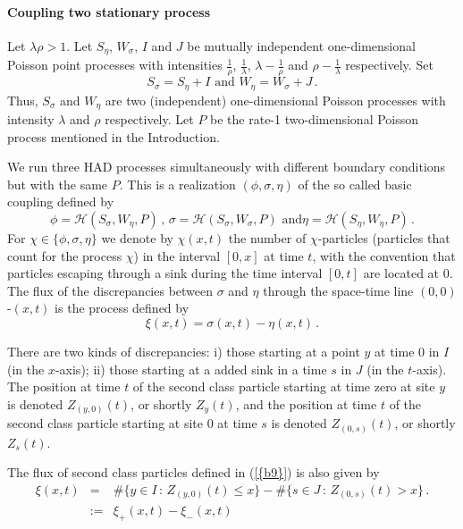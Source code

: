 \documentclass[reqno, 12pt]{amsart}
\begin{document}
\paragraph{\bf Coupling two stationary process} Let $\lambda\rho>1$. Let
$S_\eta$, $W_\sigma$, $I$ and $J$ be mutually independent one-dimensional
Poisson point processes with intensities $\frac{1}{\rho}$, $\frac{1}{\lambda}$,
$\lambda-\frac1\rho$ and $\rho-\frac1\lambda$ respectively. Set
\begin{equation}\label{flux-0}
S_\sigma=S_\eta + I\mbox{ and }W_\eta=W_\sigma + J\,.
\end{equation}
Thus, $S_\sigma$ and $W_\eta$ are two (independent) one-dimensional Poisson
processes with intensity $\lambda$ and $\rho$ respectively. Let $P$ be the
rate-1 two-dimensional Poisson process mentioned in the Introduction.

We run three HAD processes simultaneously with different boundary
conditions but with the same $P$. This is a realization $(\phi,\sigma,\eta)$ of
the so called basic coupling defined by
\[
\phi={{\mathcal H}}(S_\sigma,W_\eta,P)\,,\,\sigma={{\mathcal H}}(S_\sigma,W_\sigma,P)\mbox{ and
}\eta={{\mathcal H}}(S_\eta,W_\eta,P)\,.
\]
For $\chi\in\{\phi,\sigma,\eta\}$ we denote by $\chi(x,t)$ the number of
$\chi$-particles (particles that count for the process $\chi$) in the interval
$[0,x]$ at time $t$, with the convention that particles escaping through a sink
during the time interval $[0,t]$ are located at $0$. The flux of the
discrepancies between $\sigma$ and $\eta$ through the space-time line
$(0,0)$-$(x,t)$ is the process defined by
\begin{equation}
  \label{b9}
  \xi(x,t)=\sigma(x,t)-\eta(x,t)\,.
\end{equation}

There are two kinds of discrepancies: i) those starting at a point $y$ at time
$0$ in $I$ (in the $x$-axis); ii) those starting at a added sink in a time $s$ in $J$ (in
the $t$-axis). The position at time $t$ of the second class particle starting at time zero
at site $y$ is denoted $Z_{(y,0)}(t)$, or shortly $Z_{y}(t)$, and the position
at time $t$ of the second class particle starting at site $0$ at time
$s$ is denoted $Z_{(0,s)}(t)$, or shortly $Z_s(t)$.

The flux of second class particles defined in {(\ref{{b9}})} is also given by
\begin{eqnarray}
  \label{a44}
  \xi(x,t)&=&\#\big\{y\in I\,:\,Z_{(y,0)}(t)\leq x\big\}
  -\#\big\{s\in J\,:\,Z_{(0,s)}(t)>x\big\}\,.\nonumber\\
  &:=& \xi_+(x,t)-\xi_-(x,t)
\end{eqnarray}
\end{document}
